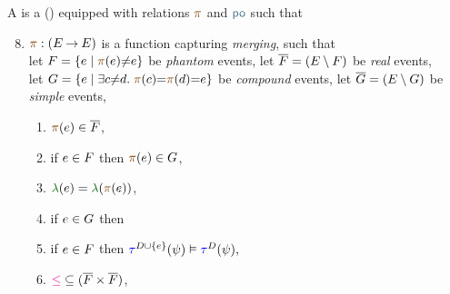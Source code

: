 \begin{definition}
  \label{def:po}
  A \PwTc{} is a \PwT{} () equipped
  with relations $\rmrg$ and
  $\rpox$ such that 
  \begin{enumerate}[,label=(\textsc{m}\arabic*),ref=\textsc{m}\arabic*]
    \setcounter{enumi}{7}
  \item \label{pom-m} 
    $\fmrg{} : (\aEvs\fun\aEvs)$
    is a function capturing \emph{merging}, such that 
    \\
    let $\phEvs=\{\aEv\mid\fmrg{\aEv}{\neq}\aEv\}$ be \emph{phantom} events,
    let $\overline{F}=(E\setminus F)$ be \emph{real} events,\\
    let $\dmEvs=\{\aEv\mid\exists\cEv{\neq}\bEv.\;\fmrg{\cEv}{=}\fmrg{\bEv}{=}\aEv\}$ be \emph{compound} events,
    let $\overline{G}=(E\setminus G)$ be \emph{simple} events,
    \begin{multicols}{2}
    \begin{enumerate}%
    \item \label{pom-m-chain}
      $\fmrg{\aEv}\in\reEvs$,
    \item \label{pom-m-phantom-compount}
      if $e\in F$ then $\fmrg{\aEv}\in\dmEvs$,
    \item \label{pom-m-lambda} 
      $\labeling(\aEv)=\labeling(\fmrg{\aEv})$,
    \item \label{pom-m-kappa} 
      if $e\in G$ then 
    \item \label{pom-m-tau} 
      if $e\in F$ then
      \begin{math}
        \aTr{\bEvs\cup\{\aEv\}}{\bForm}\rimplies \aTr{\bEvs}{\bForm},
      \end{math}
    \item \label{pom-m-le} 
      ${\le}\subseteq(\reEvs\times\reEvs)$,
    \end{enumerate}
    \end{multicols}


\end{enumerate}
\end{definition}
